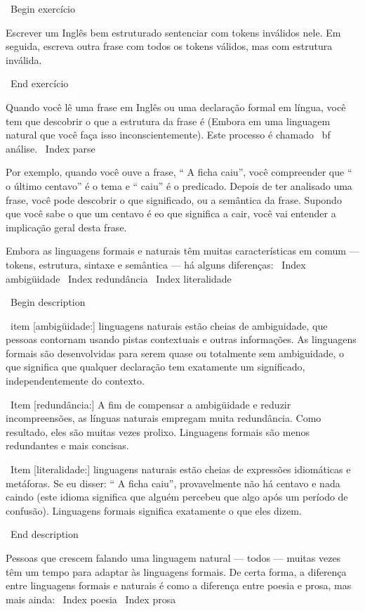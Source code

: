 \documentclass[10pt]{book}
\begin{document}
\begin {itemize}
{\ Begin {} exercício

Escrever um Inglês bem estruturado
sentenciar com tokens inválidos nele. Em seguida, escreva outra frase
com todos os tokens válidos, mas com estrutura inválida.

\ End {} exercício

Quando você lê uma frase em Inglês ou uma declaração formal em
língua, você tem que descobrir o que a estrutura da frase é
(Embora em uma linguagem natural que você faça isso inconscientemente). Este
processo é chamado {\ bf análise}.
\ Index {} parse

Por exemplo, quando você ouve a frase, `` A ficha caiu'', você
compreender que `` o último centavo'' é o tema e `` caiu'' é o
predicado. Depois de ter analisado uma frase, você pode descobrir o que
significado, ou a semântica da frase. Supondo que você sabe
o que um centavo é eo que significa a cair, você vai entender a
implicação geral desta frase.

Embora as linguagens formais e naturais têm muitas características em
comum --- tokens, estrutura, sintaxe e semântica --- há alguns
diferenças:
\ Index {ambigüidade}
\ Index {redundância}
\ Index {} literalidade

\ Begin {description}

\ item [ambigüidade:] linguagens naturais estão cheias de ambiguidade, que
pessoas contornam usando pistas contextuais e outras informações.
As linguagens formais são desenvolvidas para serem quase ou totalmente sem ambiguidade,
o que significa que qualquer declaração tem exatamente um significado,
independentemente do contexto.

\ Item [redundância:] A fim de compensar a ambigüidade e reduzir
incompreensões, as línguas naturais empregam muita
redundância. Como resultado, eles são muitas vezes prolixo. Linguagens formais
são menos redundantes e mais concisas.

\ Item [literalidade:] linguagens naturais estão cheias de expressões idiomáticas e metáforas.
Se eu disser: `` A ficha caiu'', provavelmente não há centavo e
nada caindo (este idioma significa que alguém percebeu que algo
após um período de confusão). Linguagens formais
significa exatamente o que eles dizem.

\ End {description}

Pessoas que crescem falando uma linguagem natural --- todos --- muitas vezes têm um
tempo para adaptar às linguagens formais. De certa forma, a diferença
entre linguagens formais e naturais é como a diferença entre
poesia e prosa, mas mais ainda:
\ Index {poesia}
\ Index {} prosa

}
\end{itemize}
\end{document}
